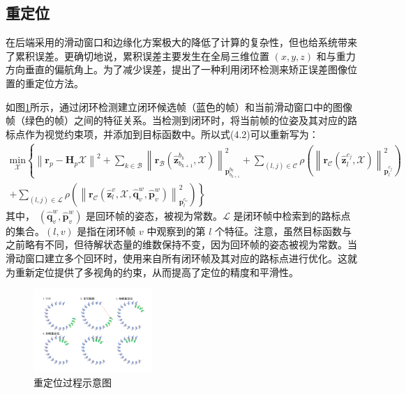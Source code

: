 \subsection{重定位}
在后端采用的滑动窗口和边缘化方案极大的降低了计算的复杂性，但也给系统带来了累积误差。更确切地说，累积误差主要发生在全局三维位置 $(x,y,z) $ 和与重力方向垂直的偏航角上。为了减少误差，提出了一种利用闭环检测来矫正误差图像位置的重定位方法。

如图\ref{fig4_8}所示，通过闭环检测建立闭环候选帧（蓝色的帧）和当前滑动窗口中的图像帧（绿色的帧）之间的特征关系。当检测到闭环时，将当前帧的位姿及其对应的路标点作为视觉约束项，并添加到目标函数中。所以式(4.2)可以重新写为：
 \begin{equation}
\label{eqn:4.34}
\begin{split}
\underset{\mathcal{X}}{\text{min}}\left\{\left\| \mathbf{r}_p-\mathbf{H}_p\mathcal{X} \right\|^2+
\sum_{k\in\mathcal{B}}\left\| \mathbf{r}_\mathcal{B}(\hat{\mathbf{z}}_{b_{k+1}}^{b_k},\mathcal{X}) \right\|
_{\mathbf{p}_{b_{k+1}}^{b_k}}^2 \right.  + 
\sum_{(l,j)\in\mathcal{C}}\rho(\left\| \mathbf{r}_\mathcal{C}(\hat{\mathbf{z}}_l^{c_j},\mathcal{X}) 
\right\|_{\mathbf{p}_l^{c_j}}^2) \\ + 
\left.\sum_{(l,j)\in\mathcal{L}}\rho(\left\|\mathbf{r}_\mathcal{C}(\hat{\mathbf{z}}_l^v,\mathcal{X},\hat{\mathbf{q}}_v^w,\hat{\mathbf{p}}_v^w) \right\|_{\mathbf{p}_l^{c_v}}^2) \right\}
\end{split}
\end{equation}
其中， $(\hat{\mathbf{q}}_v^w,\hat{\mathbf{p}}_v^w) $ 是回环帧的姿态，被视为常数。$\mathcal{L} $ 是闭环帧中检索到的路标点的集合。$(l,v) $ 是指在闭环帧 $v $ 中观察到的第 $l $ 个特征。注意，虽然目标函数与之前略有不同，但待解状态量的维数保持不变，因为回环帧的姿态被视为常数。当滑动窗口建立多个回环时，使用来自所有闭环帧及其对应的路标点进行优化。这就为重新定位提供了多视角的约束，从而提高了定位的精度和平滑性。
\begin{figure}[h]\setlength{\belowcaptionskip}{-12pt}
	\centering
	\includegraphics[width=0.4\textwidth, angle=-90]{figures/chapter4/fig4_8}
	\caption{重定位过程示意图}\label{fig4_8}
\end{figure}
